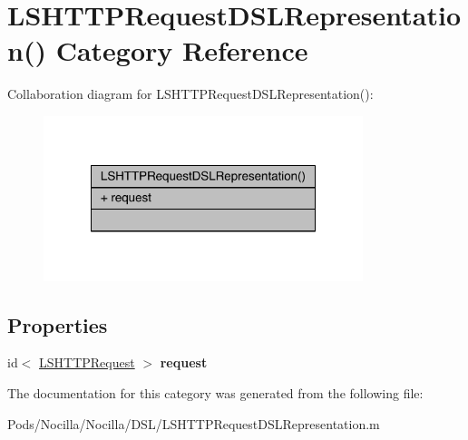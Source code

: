 \hypertarget{category_l_s_h_t_t_p_request_d_s_l_representation_07_08}{\section{L\-S\-H\-T\-T\-P\-Request\-D\-S\-L\-Representation() Category Reference}
\label{category_l_s_h_t_t_p_request_d_s_l_representation_07_08}
}


Collaboration diagram for L\-S\-H\-T\-T\-P\-Request\-D\-S\-L\-Representation()\-:\nopagebreak
\begin{figure}[H]
\begin{center}
\leavevmode
\includegraphics[width=264pt]{category_l_s_h_t_t_p_request_d_s_l_representation_07_08__coll__graph}
\end{center}
\end{figure}
\subsection*{Properties}
\begin{DoxyCompactItemize}
\item 
\hypertarget{category_l_s_h_t_t_p_request_d_s_l_representation_07_08_a6187069ae472dd33c55f9951dbf19f8e}{id$<$ \hyperlink{protocol_l_s_h_t_t_p_request-p}{L\-S\-H\-T\-T\-P\-Request} $>$ {\bfseries request}}\label{category_l_s_h_t_t_p_request_d_s_l_representation_07_08_a6187069ae472dd33c55f9951dbf19f8e}

\end{DoxyCompactItemize}


The documentation for this category was generated from the following file\-:\begin{DoxyCompactItemize}
\item 
Pods/\-Nocilla/\-Nocilla/\-D\-S\-L/L\-S\-H\-T\-T\-P\-Request\-D\-S\-L\-Representation.\-m\end{DoxyCompactItemize}
